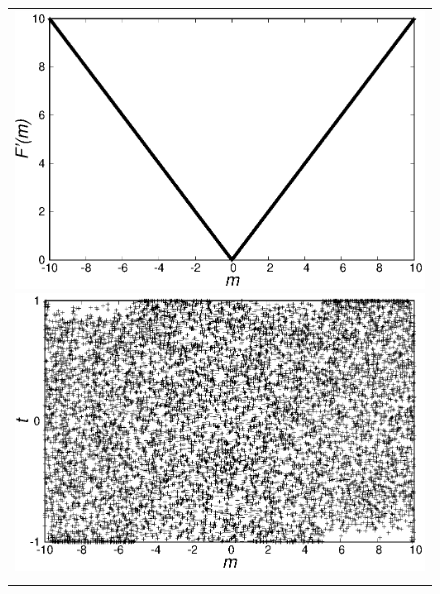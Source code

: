\documentclass[fp,twocolumn]{jpsj3}
\begin{document}

\begin{figure}[tb]
  \begin{center}
    \begin{tabular}{c}
      \begin{minipage}{0.50\hsize}
        \centering
        \includegraphics[keepaspectratio,scale=0.33]{minimum_cost.eps}
      \end{minipage}
      \begin{minipage}{0.50\hsize}
        \centering
        \includegraphics[keepaspectratio,scale=0.33]{minimum_t.eps}
      \end{minipage} \\
      \begin{minipage}{0.50\hsize}

\end{minipage}
\end{tabular}
\end{center}
\end{figure}
\end{document}
